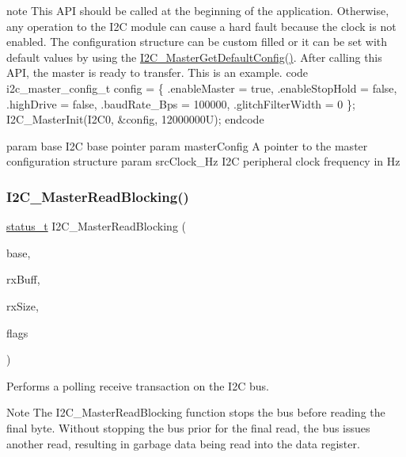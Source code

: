 note This A\+PI should be called at the beginning of the application. Otherwise, any operation to the I2C module can cause a hard fault because the clock is not enabled. The configuration structure can be custom filled or it can be set with default values by using the \mbox{\hyperlink{group__i2c__driver_gad69f2d63ea756dda60749ff6b09f587d}{I2\+C\+\_\+\+Master\+Get\+Default\+Config()}}. After calling this A\+PI, the master is ready to transfer. This is an example. code i2c\+\_\+master\+\_\+config\+\_\+t config = \{ .enable\+Master = true, .enable\+Stop\+Hold = false, .high\+Drive = false, .baud\+Rate\+\_\+\+Bps = 100000, .glitch\+Filter\+Width = 0 \}; I2\+C\+\_\+\+Master\+Init(\+I2\+C0, \&config, 12000000\+U); endcode

param base I2C base pointer param master\+Config A pointer to the master configuration structure param src\+Clock\+\_\+\+Hz I2C peripheral clock frequency in Hz \mbox{\label{group__i2c__driver_gaf77526f32a16109abf265dbb022a26ba}} 
\subsubsection{\texorpdfstring{I2C\_MasterReadBlocking()}{I2C\_MasterReadBlocking()}}
{\footnotesize\ttfamily \mbox{\hyperlink{group__ksdk__common_gaaabdaf7ee58ca7269bd4bf24efcde092}{status\+\_\+t}} I2\+C\+\_\+\+Master\+Read\+Blocking (\begin{DoxyParamCaption}\item[{\mbox{\hyperlink{struct_i2_c___type}{I2\+C\+\_\+\+Type}} $\ast$}]{base,  }\item[{uint8\+\_\+t $\ast$}]{rx\+Buff,  }\item[{size\+\_\+t}]{rx\+Size,  }\item[{uint32\+\_\+t}]{flags }\end{DoxyParamCaption})}



Performs a polling receive transaction on the I2C bus. 

\begin{DoxyNote}{Note}
The I2\+C\+\_\+\+Master\+Read\+Blocking function stops the bus before reading the final byte. Without stopping the bus prior for the final read, the bus issues another read, resulting in garbage data being read into the data register.
\end{DoxyNote}

